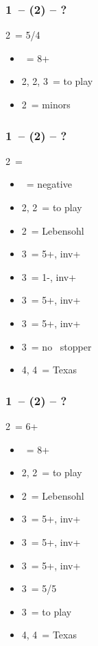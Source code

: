 \subsubsection*{1\ntx\ -- (2\clubs\alrts) -- ?}
2\clubs\ = 5/4 \major
\begin{itemize}
    \item \dbl\ = 8+
    \item 2\hearts, 2\spades, 3\clubs\ = to play
    \item 2\nt\ = minors
\end{itemize}

\subsubsection*{1\ntx\ -- (2\diams) -- ?}
2\diams\ = \diams
\begin{itemize}
    \item \dbl\ = negative
    \item 2\hearts, 2\spades\ = to play
    \item 2\nt\ = Lebensohl
    \item 3\clubs\ = 5+\hearts, inv+
    \item 3\diams\ = 1-\diams, inv+
    \item 3\hearts\ = 5+\spades, inv+
    \item 3\spades\ = 5+\clubs, inv+
    \item 3\nt\ = no \diams\ stopper
    \item 4\diams, 4\hearts\ = Texas
\end{itemize}

\subsubsection*{1\ntx\ -- (2\diams\alrts) -- ?}
2\diams\ = 6+ \major
\begin{itemize}
    \item \dbl\ = 8+
    \item 2\hearts, 2\spades\ = to play
    \item 2\nt\ = Lebensohl
    \item 3\clubs\ = 5+\diams, inv+
    \item 3\diams\ = 5+\hearts, inv+
    \item 3\hearts\ = 5+\spades, inv+
    \item 3\spades\ = 5/5 \minor
    \item 3\nt\ = to play
    \item 4\diams, 4\hearts\ = Texas
\end{itemize}


